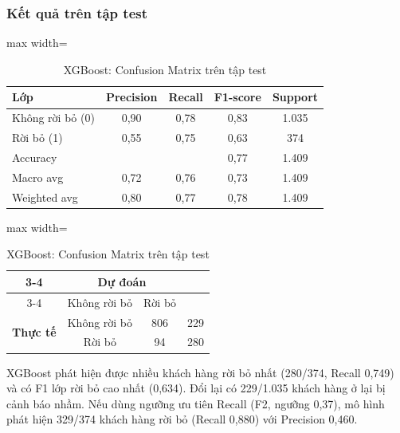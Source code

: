 \subsubsection{Kết quả trên tập test}
\begin{table}[H]
\centering
\begin{minipage}[t]{0.56\textwidth}
\centering
\small
\begin{adjustbox}{max width=\textwidth}
\begin{tabular}{|l|c|c|c|c|}
\hline
\textbf{Lớp} & \textbf{Precision} & \textbf{Recall} & \textbf{F1-score} & \textbf{Support} \\
\hline
Không rời bỏ (0) & 0,90 & 0,78 & 0,83 & 1.035 \\
\hline
Rời bỏ (1) & 0,55 & 0,75 & 0,63 & 374 \\
\hline
Accuracy & & & 0,77 & 1.409 \\
\hline
Macro avg & 0,72 & 0,76 & 0,73 & 1.409 \\
\hline
Weighted avg & 0,80 & 0,77 & 0,78 & 1.409 \\
\hline
\end{tabular}
\end{adjustbox}
\caption{XGBoost: kết quả phân loại trên tập test (ngưỡng 0,57; ROC-AUC 0,846; PR-AUC 0,662)}
\end{minipage}\hfill
\begin{minipage}[t]{0.42\textwidth}
\centering
\small
\begin{adjustbox}{max width=\textwidth}
\begin{tabular}{|c|c|c|c|}
\cline{3-4}
\multicolumn{2}{c|}{} & \multicolumn{2}{c|}{\textbf{Dự đoán}} \\
\cline{3-4}
\multicolumn{2}{c|}{} & Không rời bỏ & Rời bỏ \\
\hline
\multirow{2}{*}{\textbf{Thực tế}} & Không rời bỏ & \cellcolor{blue!30}806 & 229 \\
\cline{2-4}
 & Rời bỏ & 94 & \cellcolor{blue!30}280 \\
\hline
\end{tabular}
\end{adjustbox}
\caption{XGBoost: Confusion Matrix trên tập test}
\end{minipage}
\end{table}

XGBoost phát hiện được nhiều khách hàng rời bỏ nhất (280/374, Recall 0,749) và có F1 lớp rời bỏ cao nhất (0,634). Đổi lại có 229/1.035 khách hàng ở lại bị cảnh báo nhầm. Nếu dùng ngưỡng ưu tiên Recall (F2, ngưỡng 0,37), mô hình phát hiện 329/374 khách hàng rời bỏ (Recall 0,880) với Precision 0,460.

